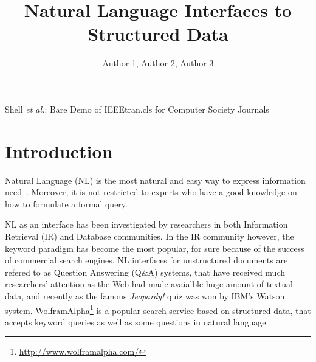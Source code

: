 \documentclass[10pt,journal,letterpaper,compsoc]{IEEEtran}
\begin{document}
%
\title{Natural Language Interfaces to Structured Data}


\author{Author 1, Author 2, Author 3}





%
{Shell \MakeLowercase{\textit{et al.}}: Bare Demo of IEEEtran.cls for Computer Society Journals}



\maketitle



\IEEEdisplaynotcompsoctitleabstractindextext



\IEEEpeerreviewmaketitle

\section{Introduction}
\label{sec:introduction}


Natural Language (NL) is the most natural and easy way to express information
need~\cite{Hearst:2011:NSU:2018396.2018414}. Moreover, it is not restricted to
experts who have a good knowledge on how to formulate a formal query.

NL as an interface has been investigated by researchers in both Information
Retrieval (IR) and Database communities. In the IR community however, the
keyword paradigm has become the most popular, for sure because of the success of
commercial search engines. NL interfaces for unstructured documents are
refered to as Question Answering (Q\&A) systems, that have received much
researchers' attention as the Web had made avaialble huge amount of textual
data, and recently as the famous {\it Jeopardy!} quiz was won by IBM's {\sc
Watson}~\cite{FerrucciBCFGKLMNPSW10} system.
{\sc WolframAlpha}\footnote{\url{http://www.wolframalpha.com/}} is a popular
search service based on structured data, that accepts keyword queries as well
as some questions in natural language.
\end{document}
